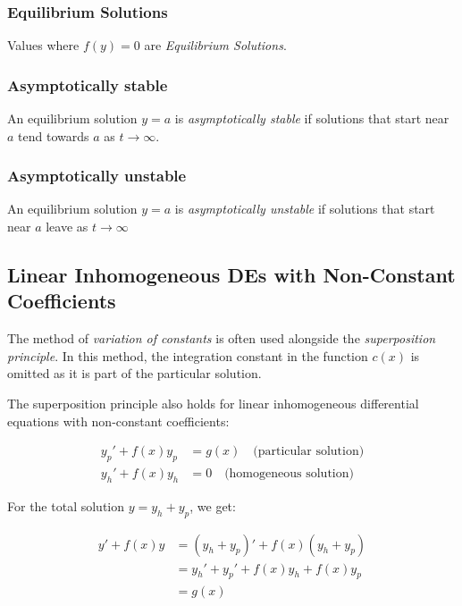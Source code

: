 \subsubsection{Equilibrium Solutions}

Values where \(f(y) = 0\) are \emph{Equilibrium Solutions}.

\subsubsection*{Asymptotically stable}

An equilibrium solution \(y = a\) is \emph{asymptotically stable} if solutions
that start near \(a\) tend towards \(a\) as \(t \to \infty\).

\subsubsection*{Asymptotically unstable}

An equilibrium solution \(y = a\) is \emph{asymptotically unstable} if solutions
that start near \(a\) leave as \(t \to \infty\)

\subsection{Linear Inhomogeneous DEs with Non-Constant Coefficients}

The method of \emph{variation of constants} is often used alongside the \emph{superposition principle}. 
In this method, the integration constant in the function \( c(x) \) is omitted as it is part of the 
particular solution.
\vspace{\baselineskip}

The superposition principle also holds for linear inhomogeneous differential equations with 
non-constant coefficients:

\begin{align*}
    y_p' + f(x)y_p &= g(x) \quad \text{(particular solution)} \\
    y_h' + f(x)y_h &= 0 \quad \text{(homogeneous solution)}
\end{align*}

For the total solution \( y = y_h + y_p \), we get:

\begin{align*}
    y' + f(x)y 
    &= (y_h + y_p)' + f(x)(y_h + y_p) \\
    &= y_h' + y_p' + f(x)y_h + f(x)y_p \\
    &= g(x)
\end{align*}

